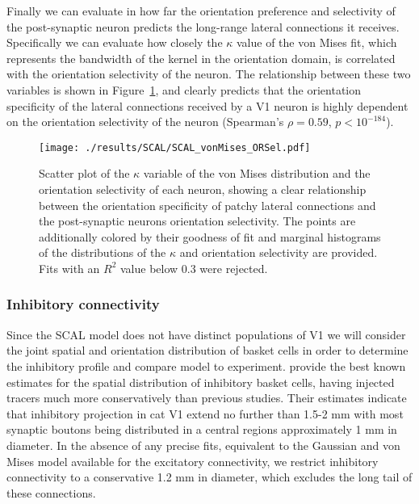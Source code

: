 Finally we can evaluate in how far the orientation preference and
selectivity of the post-synaptic neuron predicts the long-range
lateral connections it receives. Specifically we can evaluate how
closely the $\kappa$ value of the von Mises fit, which represents the
bandwidth of the kernel in the orientation domain, is correlated with
the orientation selectivity of the neuron. The relationship between
these two variables is shown in Figure~\ref{LatORKappa}, and clearly
predicts that the orientation specificity of the lateral connections
received by a V1 neuron is highly dependent on the orientation
selectivity of the neuron (Spearman's $\rho=0.59$, $p<10^{-184}$).


\begin{figure}
	\centering
        \texttt{[image: ./results/SCAL/SCAL\_vonMises\_ORSel.pdf]}
	\caption[Relationship between the width of vonMises distribution
      in the lateral connectivity model and the orientation
      selectivity of the neuron.]{Scatter plot of the $\kappa$
      variable of the von Mises distribution and the orientation
      selectivity of each neuron, showing a clear relationship between
      the orientation specificity of patchy lateral connections and
      the post-synaptic neurons orientation selectivity. The points
      are additionally colored by their goodness of fit and marginal
      histograms of the distributions of the $\kappa$ and orientation
      selectivity are provided. Fits with an $R^2$ value below 0.3
      were rejected.}
	\label{LatORKappa}
\end{figure}

\subsubsection*{Inhibitory connectivity}

Since the SCAL model does not have distinct populations of V1 we will
consider the joint spatial and orientation distribution of basket
cells in order to determine the inhibitory profile and compare model
to experiment. \cite{Kisvarday1997a} provide the best known estimates
for the spatial distribution of inhibitory basket cells, having
injected tracers much more conservatively than previous studies. Their
estimates indicate that inhibitory projection in cat V1 extend no
further than 1.5-2 mm with most synaptic boutons being distributed in
a central regions approximately 1 mm in diameter. In the absence of
any precise fits, equivalent to the Gaussian and von Mises model
available for the excitatory connectivity, we restrict inhibitory
connectivity to a conservative 1.2 mm in diameter, which excludes the
long tail of these connections.

